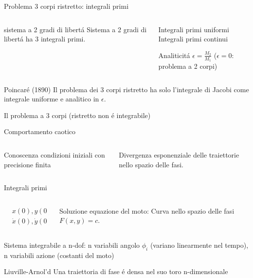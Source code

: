 \begin{frame}{Problema 3 corpi ristretto: integrali primi}
\begin{columns}[T]
\begin{column}{0.5\textwidth}
\begin{block}{sistema a 2 gradi di libert\'a}
Sistema a 2 gradi di libert\'a ha 3 integrali primi.
\end{block}
\end{column}
\begin{column}{0.5\textwidth}
\begin{block}{Integrali primi uniformi}
Integrali primi continui
\end{block}
\begin{block}{Analiticit\'a}
$\epsilon=\frac{M_2}{M_1}$ ($\epsilon=0$: problema a 2 corpi)
\end{block}
\end{column}
\end{columns}
\begin{block}{Poincar\'e (1890)}
Il problema dei 3 corpi ristretto ha solo l'integrale di Jacobi come integrale uniforme e analitico in $\epsilon$.
\end{block}
Il problema a 3 corpi (ristretto non \'e integrabile)
\begin{block}{Comportamento caotico}
\begin{columns}[T]
\begin{column}{0.5\textwidth}
Conoscenza condizioni iniziali con precisione finita
\end{column}
\begin{column}{0.5\textwidth}
Divergenza esponenziale delle traiettorie nello spazio delle fasi.
\end{column}
\end{columns}
\end{block}
\end{frame}

\begin{wordonframe}{Integrali primi}
\begin{columns}[T]
\begin{column}{0.5\textwidth}
\begin{align*}
&x(0),y(0)\\
&\dot{x}(0),\dot{y}(0)
\end{align*}
\end{column}
\begin{column}{0.5\textwidth}
Soluzione equazione del moto: Curva nello spazio delle fasi $F(x,y)=c$.
\end{column}
\end{columns}
Sistema integrabile a n-dof: n variabili angolo $\phi_i$ (variano linearmente nel tempo), n variabili azione (costanti del moto)
\begin{block}{Liuville-Arnol'd}
Una traiettoria di fase \'e densa nel suo toro n-dimensionale
\end{block}
\end{wordonframe}

